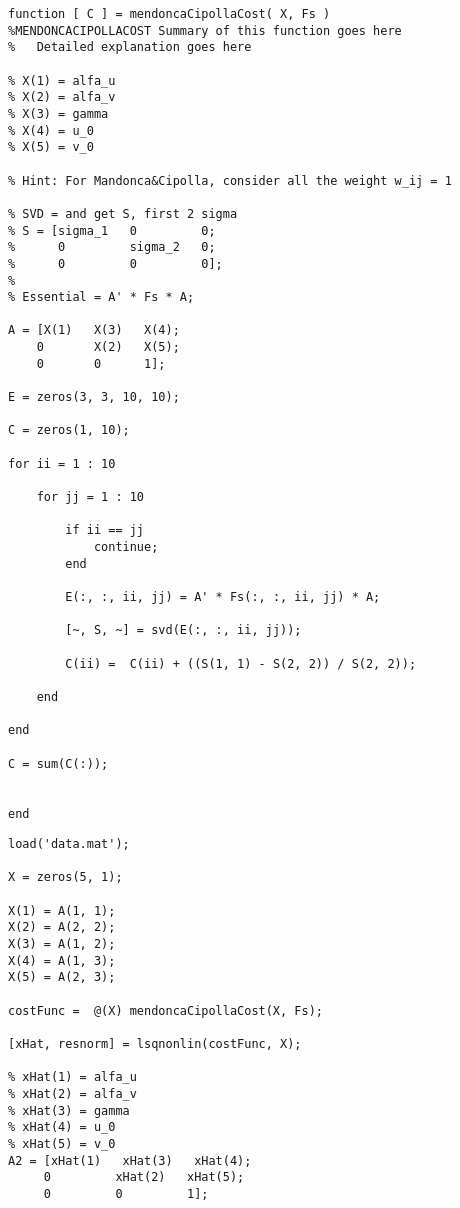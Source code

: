 \documentclass{article}
\begin{document}
		\begin{lstlisting}[label=mendonca-and-cipolla-cost, caption=Mendonca and Cipolla Cost]
function [ C ] = mendoncaCipollaCost( X, Fs )
%MENDONCACIPOLLACOST Summary of this function goes here
%   Detailed explanation goes here

% X(1) = alfa_u
% X(2) = alfa_v
% X(3) = gamma
% X(4) = u_0
% X(5) = v_0

% Hint: For Mandonca&Cipolla, consider all the weight w_ij = 1

% SVD = and get S, first 2 sigma
% S = [sigma_1   0         0;
%      0         sigma_2   0;
%      0         0         0];
%
% Essential = A' * Fs * A;

A = [X(1)   X(3)   X(4);
    0       X(2)   X(5);
    0       0      1];

E = zeros(3, 3, 10, 10);

C = zeros(1, 10);

for ii = 1 : 10
    
    for jj = 1 : 10
        
        if ii == jj
            continue;
        end
        
        E(:, :, ii, jj) = A' * Fs(:, :, ii, jj) * A;

        [~, S, ~] = svd(E(:, :, ii, jj));
        
        C(ii) =  C(ii) + ((S(1, 1) - S(2, 2)) / S(2, 2));
        
    end
    
end

C = sum(C(:));


end
\end{lstlisting}  

\begin{lstlisting}[label=mendonca-and-cipolla-test, caption=Mendonca and Cipolla Test]
load('data.mat');

X = zeros(5, 1);

X(1) = A(1, 1);
X(2) = A(2, 2);
X(3) = A(1, 2);
X(4) = A(1, 3);
X(5) = A(2, 3);

costFunc =  @(X) mendoncaCipollaCost(X, Fs);

[xHat, resnorm] = lsqnonlin(costFunc, X);

% xHat(1) = alfa_u
% xHat(2) = alfa_v
% xHat(3) = gamma
% xHat(4) = u_0
% xHat(5) = v_0
A2 = [xHat(1)   xHat(3)   xHat(4);
     0         xHat(2)   xHat(5);
     0         0         1];
 
\end{lstlisting}  
\end{document}
